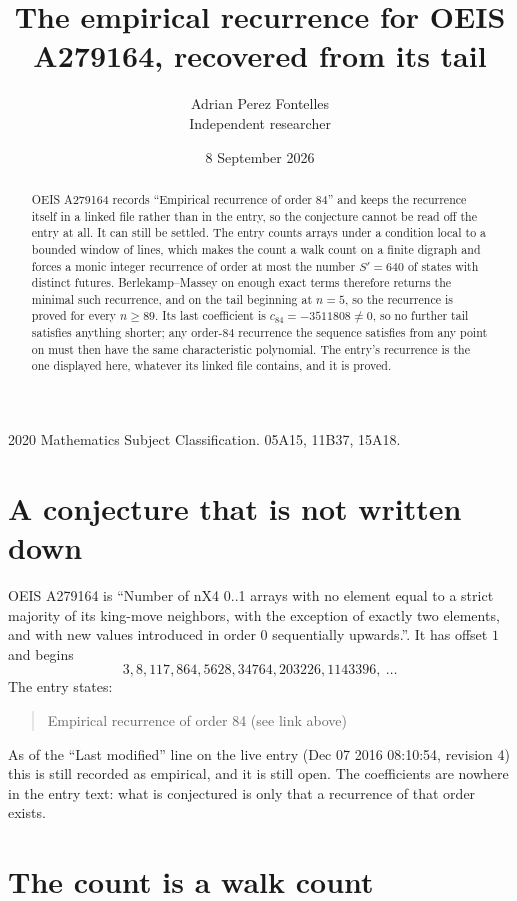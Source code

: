 \documentclass[11pt,a4paper]{article}
\title{The empirical recurrence for OEIS A279164, recovered from its tail}
\author{Adrian Perez Fontelles\\ \small Independent researcher}
\date{8 September 2026}
\theoremstyle{plain}
\theoremstyle{definition}
\begin{document}
\maketitle

\begin{abstract}
OEIS A279164 records ``Empirical recurrence of order $84$'' and keeps the recurrence itself in
a linked file rather than in the entry, so the conjecture cannot be read off the entry at all.
It can still be settled. The entry counts arrays under a condition local to a bounded window of
lines, which makes the count a walk count on a finite digraph and forces a monic integer
recurrence of order at most the number $S'=640$ of states with distinct futures. Berlekamp--Massey on
enough exact terms therefore returns the minimal such recurrence, and on the tail beginning at $n=5$, so the recurrence is proved for every $n\ge89$.
Its last coefficient is $c_{84}=-3511808\neq0$, so no further tail satisfies anything
shorter; any order-$84$ recurrence the sequence satisfies from any point on must then have
the same characteristic polynomial. The entry's recurrence is the one displayed here, whatever
its linked file contains, and it is proved.
\end{abstract}

\noindent\small 2020 Mathematics Subject Classification. 05A15, 11B37, 15A18.\normalsize

\section{A conjecture that is not written down}

OEIS A279164 is ``Number of nX4 0..1 arrays with no element equal to a strict majority of its king-move neighbors, with the exception of exactly two elements, and with new values introduced in order 0 sequentially upwards.''. It has offset $1$ and begins
\[
3, 8, 117, 864, 5628, 34764, 203226, 1143396,\ \dots
\]
The entry states:
\begin{quote}
Empirical recurrence of order 84 (see link above)
\end{quote}
As of the ``Last modified'' line on the live entry (Dec 07 2016 08:10:54, revision 4)
this is still recorded as empirical, and it is still open. The coefficients are nowhere in the
entry text: what is conjectured is only that a recurrence of that order exists.

\section{The count is a walk count}
\end{document}
